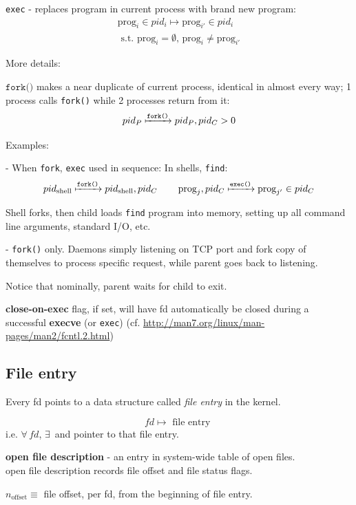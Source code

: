 \documentclass[10pt]{amsart}
\begin{document}
\texttt{exec} - replaces program in current process with brand new program:
\[
\begin{gathered}
\text{prog}_i \in pid_i \mapsto \text{prog}_{i'} \in pid_i \\
\text{ s.t. } \text{prog}_i = \emptyset, \, \text{prog}_i \neq \text{prog}_{i'}
\end{gathered}
\]

More details:

$\texttt{fork()}$ makes a near duplicate of current process, identical in almost every way; 1 process calls \texttt{fork()} while 2 processes return from it:
\[
pid_P \xmapsto{\texttt{fork()}} pid_P, pid_C >0
\]

Examples:

- When \texttt{fork}, \texttt{exec} used in sequence: 
In shells, \texttt{find}: 
\[
pid_{\text{shell}} \xmapsto{\texttt{fork()}} pid_{\text{shell}}, pid_C \qquad \, \text{prog}_j, pid_C \xmapsto{\texttt{exec()}} \text{prog}_{j'} \in pid_C
\] 

Shell forks, then child loads \texttt{find} program into memory, setting up all command line arguments, standard I/O, etc.

- \texttt{fork()} only.
Daemons simply listening on TCP port and fork copy of themselves to process specific request, while parent goes back to listening. 

Notice that nominally, parent waits for child to exit. 

\textbf{close-on-exec} flag, if set, will have fd automatically be closed during a successful \textbf{execve} (or \texttt{exec}) (cf. \url{http://man7.org/linux/man-pages/man2/fcntl.2.html})

\subsection{File entry}

Every fd points to a data structure called \emph{file entry} in the kernel.

\[
fd \mapsto \text{ file entry }
\]
i.e. $\forall \, fd$, $\exists \,$  and pointer to that file entry.


\textbf{open file description} - an entry in system-wide table of open files. \\
open file description records file offset and file status flags.

$n_{\text{offset}} \equiv $ file offset, per fd, from the beginning of file entry.
\end{document}
